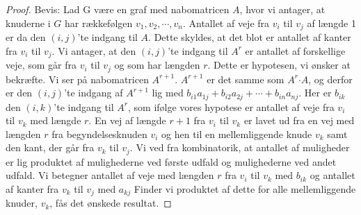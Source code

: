 \begin{proof}
Bevis: Lad G være en graf med nabomatricen 
\textbf{$A$}, hvor vi antager, at knuderne i $G$ har rækkefølgen $v_{1},v_{2},\cdots,v_{n}$. Antallet af veje fra $v_{i}$ til $v_{j}$ af længde 1 er da den $(i,j)$'te indgang til 
\textbf{$A$}. Dette skyldes, at det blot er antallet af kanter fra $v_{i}$ til $v_{j}$.
Vi antager, at den $(i,j)$'te indgang til 
\textbf{${A^r}$} er antallet af forskellige veje, som går fra $v_{i}$ til $v_{j}$ og som har længden $r$. Dette er hypotesen, vi ønsker at bekræfte.
Vi ser på nabomatricen \textbf{$A^{r+1}$}. 
\textbf{$A^{r+1}$} er det samme som 
\textbf{$A^{r}$}$\cdot$\textbf{$A$}, og derfor er den $(i,j)$'te indgang af \textbf{$A^{r+1}$} lig med $b_{i1}a_{1j} + b_{i2}a_{2j} +\cdots+ b_{in}a_{nj}$. Her er $b_{ik}$  den $(i,k)$'te indgang til 
\textbf{$A^{r}$}, som ifølge vores hypotese er antallet af veje fra $v_{i}$ til $v_{k}$ med længde $r$.
En vej af længde $r + 1$ fra $v_{i}$ til $v_{k}$ er lavet ud fra en vej med længden $r$ fra begyndelsesknuden $v_{i}$ og hen til en mellemliggende knude $v_{k}$ samt den kant, der går fra $v_{k}$ til $v_{j}$. Vi ved fra kombinatorik, at antallet af muligheder er lig produktet af mulighederne ved første udfald og mulighederne ved andet udfald. Vi betegner antallet af veje med længden $r$ fra $v_{i}$ til $v_{k}$ med $b_{ik}$ og antallet af kanter fra $v_{k}$ til $v_{j}$ med $a_{kj}$ Finder vi produktet af dette for alle mellemliggende knuder, $v_{k}$, fås det ønskede resultat.
\end{proof}


